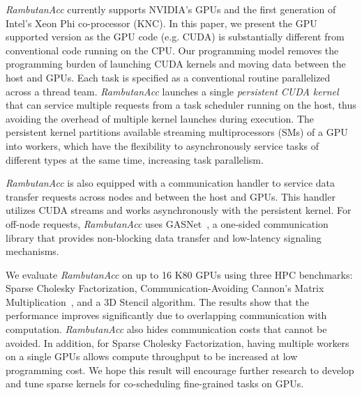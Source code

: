 {\em RambutanAcc} currently supports NVIDIA's GPUs and the first generation of Intel's Xeon Phi co-processor (KNC).
In this paper, we present the GPU supported version as the GPU code (e.g. CUDA) is substantially different from conventional code running on the CPU.
Our programming model removes the programming burden of launching CUDA kernels and moving data between the host and GPUs.
Each task is specified as a conventional routine parallelized across a thread team.
{\em RambutanAcc} launches a single {\em persistent CUDA kernel} that can service multiple requests from a task scheduler running on the host, thus avoiding the overhead of multiple kernel launches during execution.
The persistent kernel partitions available streaming multiprocessors (SMs) of a GPU into workers, which have the flexibility to asynchronously service tasks of different types at the same time, increasing task parallelism.

{\em RambutanAcc} is also equipped with a communication handler to service data transfer requests across nodes and between the host and GPUs.
This handler utilizes CUDA streams and works asynchronously with the persistent kernel.
For off-node requests, {\em RambutanAcc} uses GASNet~\cite{Bonachea:2002:gasnet}, a one-sided communication library %
that provides non-blocking data transfer and low-latency signaling mechanisms. %

We evaluate {\em RambutanAcc} on up to 16 K80 GPUs using three HPC benchmarks: Sparse Cholesky Factorization, Communication-Avoiding Cannon's Matrix Multiplication~\cite{25Dcannon}, and a 3D Stencil algorithm.
The results show that the performance improves significantly due to overlapping communication with computation.
{\em RambutanAcc} also hides communication costs that cannot be avoided.
In addition, for Sparse Cholesky Factorization, having multiple workers on a single GPUs allows compute throughput to be increased at low programming cost. 
We hope this result will encourage further research to develop and tune sparse kernels for co-scheduling fine-grained tasks on GPUs.

